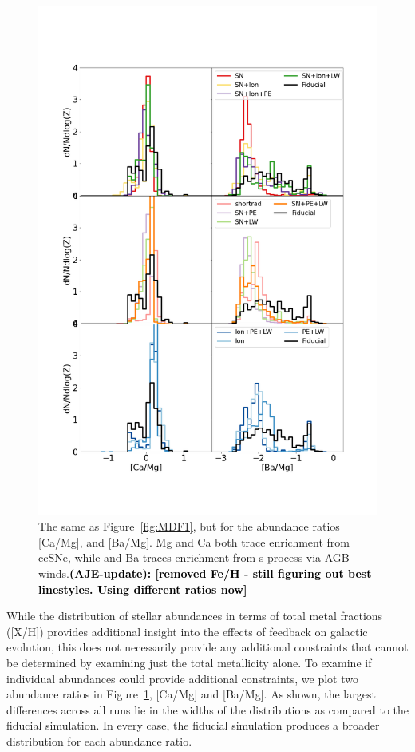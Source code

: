 \documentclass[twocolumn]{aastex62}
\newcommand{\changed}[1]{\textcolor{black}{\textbf{(AJE-update): #1}}}
\begin{document}
\begin{figure}
  \centering
  \includegraphics[width=1.1\linewidth]{figures/CaMg_BaMg__stellar_MDFs}
  \caption{The same as Figure~\ref{fig:MDF1}, but for the abundance ratios [Ca/Mg], and [Ba/Mg]. Mg and Ca both trace enrichment from ccSNe, while and Ba traces enrichment from s-process via AGB winds.\changed{[removed Fe/H - still figuring out best linestyles. Using different ratios now]}}
  \label{fig:MDF2}
\end{figure}


While the distribution of stellar abundances in terms of total metal fractions ([X/H]) provides additional insight into the effects of feedback on galactic evolution, this does not necessarily provide any additional constraints that cannot be determined by examining just the total metallicity alone. To examine if individual abundances could provide additional constraints, we plot two abundance ratios in Figure~\ref{fig:MDF2}, [Ca/Mg] and [Ba/Mg]. As shown, the largest differences across all runs lie in the widths of the distributions as compared to the fiducial simulation. In every case, the fiducial simulation produces a broader distribution for each abundance ratio. 
\end{document}
